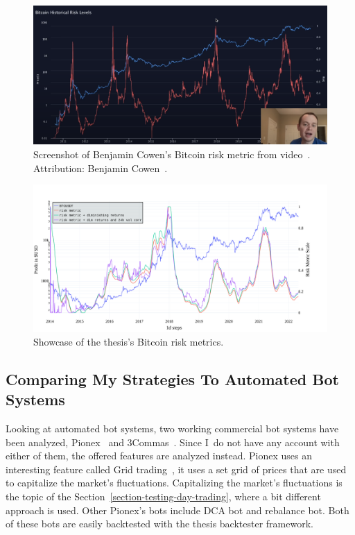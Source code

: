 \begin{figure}[!hbt]
    \centering
    \includegraphics[width=\columnwidth]{figures/cowen-riskmetric-screenshot.png}
    \caption{Screenshot of Benjamin Cowen's Bitcoin risk metric from video~\cite{youtube:bitcoin-risk-metric-latest}. Attribution: Benjamin Cowen~\cite{youtube:cowen-yt-channel}.}
    \label{figure-cowen-screenshot}
\end{figure}

\begin{figure}[!hbt]
    \centering
    \includegraphics[width=\columnwidth]{figures/combined-bitcoin-metrics.pdf}
    \caption{Showcase of the thesis's Bitcoin risk metrics.}
    \label{figure-combined-bitcoin-riskmetric}
\end{figure}

\subsection*{Comparing My Strategies To Automated Bot Systems}
Looking at automated bot systems, two working commercial bot systems have been analyzed, Pionex~\cite{pionex} and 3Commas~\cite{3commas}. Since I~do not have any account with either of them, the offered features are analyzed instead. Pionex uses an interesting feature called Grid trading~\cite{pionex-grid-trading}, it uses a set grid of prices that are used to capitalize the market's fluctuations. Capitalizing the market's fluctuations is the topic of the Section~\ref{section-testing-day-trading}, where a bit different approach is used. Other Pionex's bots include DCA bot and rebalance bot. Both of these bots are easily backtested with the thesis backtester framework.

